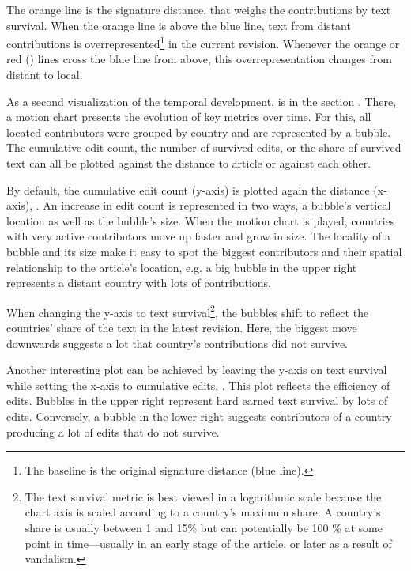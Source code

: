 The orange line is the  signature distance, that weighs the contributions by text survival.
When the orange line is above the blue line, text from distant contributions is overrepresented\footnote{The baseline is the original signature distance (blue line).} in the current revision.
Whenever the orange or red () lines cross the blue line from above, this overrepresentation changes from distant to local.


As a second visualization of the temporal development, is in the section .
There, a motion chart presents the evolution of key metrics over time.
For this, all located contributors were grouped by country and are represented by a bubble. 
The cumulative edit count, the number of survived edits, or the share of survived text can all be plotted against the distance to article or against each other.


By default, the cumulative edit count (y-axis) is plotted again the distance (x-axis), .
An increase in edit count is represented in two ways, a bubble's vertical location as well as the bubble's size.
When the motion chart is played, countries with very active contributors move up faster and grow in size. 
The locality of a bubble and its size make it easy to spot the biggest contributors and their spatial relationship to the article's location, e.g. a big bubble in the upper right represents a distant country with lots of contributions. 

When changing the y-axis to text survival\footnote{The text survival metric is best viewed in a logarithmic scale because the chart axis is scaled according to a country's maximum share. A country's share is usually between 1 and 15\% but  can potentially be 100 \% at some point in time---usually in an early stage of the article, or later as a result of vandalism.}, the bubbles shift to reflect the countries' share of the text in the latest revision.
Here, the biggest move downwards suggests a lot that country's contributions did not survive.


Another interesting plot can be achieved by leaving the y-axis on text survival while setting the x-axis to cumulative edits, .
This plot reflects the efficiency of edits. 
Bubbles in the upper right represent hard earned text survival by lots of edits.
Conversely, a bubble in the lower right suggests contributors of a country producing a lot of edits that do not survive.

